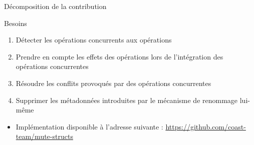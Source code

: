 \begin{frame}{Décomposition de la contribution}
    \begin{block}{Besoins}
        \begin{enumerate}
            \item Détecter les opérations concurrents aux opérations \ren
            \item Prendre en compte les effets des opérations \ren lors de l'intégration des opérations concurrentes
            \pause
            \item Résoudre les conflits provoqués par des opérations \ren concurrentes
            \pause
            \item Supprimer les métadonnées introduites par le mécanisme de renommage lui-même
        \end{enumerate}
    \end{block}
    \pause
    \begin{itemize}
        \item Implémentation disponible à l'adresse suivante : \url{https://github.com/coast-team/mute-structs}
    \end{itemize}
\end{frame}
